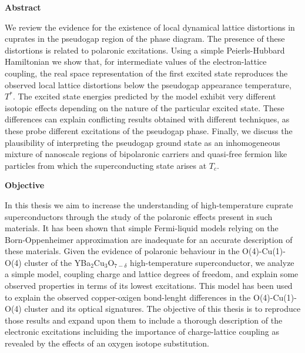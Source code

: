 
\cleardoublepage
{}
{}
\begin{center}
\textbf{\large Abstract}
\end{center}
We review the evidence for the existence of local dynamical lattice distortions in cuprates in the pseudogap region of the phase diagram. 
The presence of these distortions is related to polaronic excitations. 
Using a simple Peierls-Hubbard Hamiltonian we show that, for intermediate values of the electron-lattice coupling, the real space representation of the first excited state reproduces the observed local lattice distortions below the pseudogap appearance temperature, $T^*$. 
The excited state energies predicted by the model exhibit very different isotopic effects depending on the nature of the particular excited state. 
These differences can explain conflicting results obtained with different techniques, as these probe different excitations of the pseudogap phase. 
Finally, we discuss the plausibility of interpreting the pseudogap ground state as an inhomogeneous mixture of nanoscale regions of bipolaronic carriers and quasi-free fermion like particles from which the superconducting state arises at $T_c$.


\cleardoublepage
{}
{}
\begin{center}
\textbf{\large Objective}
\end{center}

In this thesis we aim to increase the understanding of high-temperature cuprate superconductors through the study of the polaronic effects present in such materials.
It has been shown that simple Fermi-liquid models relying on the Born-Oppenheimer approximation are inadequate for an accurate description of these materials.
Given the evidence of polaronic behaviour in the O(4)-Cu(1)-O(4) cluster of the YBa$_2$Cu$_3$O$_{7-\delta}$ high-temperature superconductor, we analyze a simple model, coupling charge and lattice degrees of freedom, and explain some observed properties in terms of its lowest excitations.
This model has been used to explain the observed copper-oxigen bond-lenght differences in the O(4)-Cu(1)-O(4) cluster and its optical signatures.
The objective of this thesis is to reproduce those results and expand upon them to include a thorough description of the electronic excitations incluiding the importance of charge-lattice coupling as revealed by the effects of an oxygen isotope substitution.

